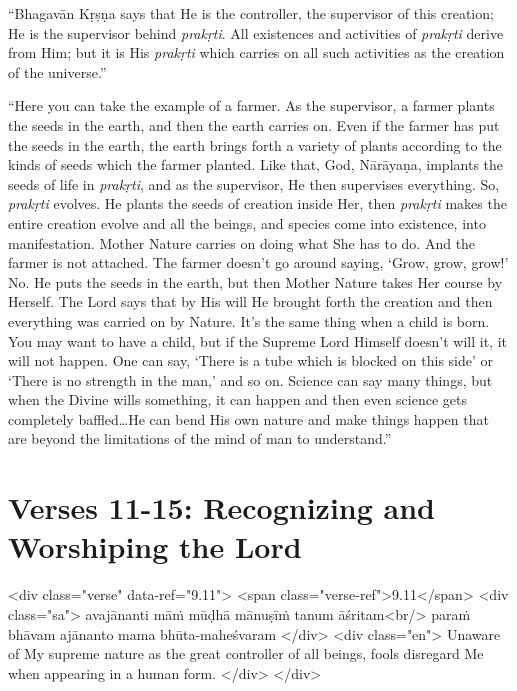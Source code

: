 \enquote{Bhagavān Kṛṣṇa says that He is the controller, the supervisor of this creation; He is the supervisor behind \textit{prakṛti}. All existences and activities of \textit{prakṛti} derive from Him; but it is His \textit{prakṛti} which carries on all such activities as the creation of the universe.}

\enquote{Here you can take the example of a farmer. As the supervisor, a farmer plants the seeds in the earth, and then the earth carries on. Even if the farmer has put the seeds in the earth, the earth brings forth a variety of plants according to the kinds of seeds which the farmer planted. Like that, God, Nārāyaṇa, implants the seeds of life in \textit{prakṛti}, and as the supervisor, He then supervises everything. So, \textit{prakṛti} evolves. He plants the seeds of creation inside Her, then \textit{prakṛti} makes the entire creation evolve and all the beings, and species come into existence, into manifestation. Mother Nature carries on doing what She has to do. And the farmer is not attached. The farmer doesn’t go around saying, \enquote{Grow, grow, grow!} No. He puts the seeds in the earth, but then Mother Nature takes Her course by Herself. The Lord says that by His will He brought forth the creation and then everything was carried on by Nature. It’s the same thing when a child is born. You may want to have a child, but if the Supreme Lord Himself doesn’t will it, it will not happen. One can say, \enquote{There is a tube which is blocked on this side} or \enquote{There is no strength in the man,} and so on. Science can say many things, but when the Divine wills something, it can happen and then even science gets completely baffled\ldots He can bend His own nature and make things happen that are beyond the limitations of the mind of man to understand.}

\newpage

\section{Verses 11-15: Recognizing and Worshiping the Lord}\label{sec-verses-11-15-recognizing-and-worshiping-the-lord}


\begin{html}
<div class="verse" data-ref="9.11">
  <span class="verse-ref">9.11</span>
  <div class="sa">
    avajānanti māṁ mūḍhā mānuṣīṁ tanum āśritam<br/>
    paraṁ bhāvam ajānanto mama bhūta-maheśvaram
  </div>
  <div class="en">
    Unaware of My supreme nature as the great controller of all beings, fools disregard Me when appearing in a human form.
  </div>
</div>
\end{html}




